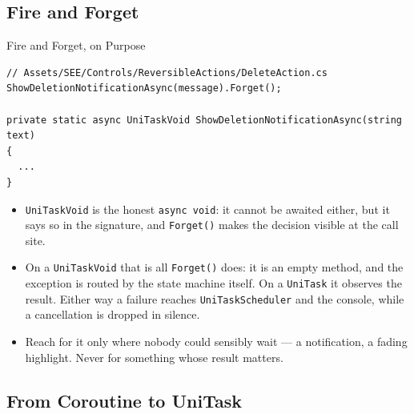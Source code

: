 \subsection{Fire and Forget}

\begin{frame}[fragile]{Fire and Forget, on Purpose}
  \begin{lstlisting}[basicstyle=\scriptsize\ttfamily]
// Assets/SEE/Controls/ReversibleActions/DeleteAction.cs
ShowDeletionNotificationAsync(message).Forget();

private static async UniTaskVoid ShowDeletionNotificationAsync(string text)
{
  ...
}
  \end{lstlisting}
  \vspace{1ex}

  \begin{itemize}
    \item \texttt{UniTaskVoid} is the honest \texttt{async void}: it cannot be
      awaited either, but it says so in the signature, and \texttt{Forget()}
      makes the decision visible at the call site.
    \item On a \texttt{UniTaskVoid} that is all \texttt{Forget()} does: it is
      an empty method, and the exception is routed by the state machine itself.
      On a \texttt{UniTask} it observes the result. Either way a failure
      reaches \texttt{UniTaskScheduler} and the console, while a cancellation
      is dropped in silence.
    \item Reach for it only where nobody could sensibly wait --- a
      notification, a fading highlight. Never for something whose result
      matters.
  \end{itemize}
\end{frame}

\subsection{From Coroutine to UniTask}

